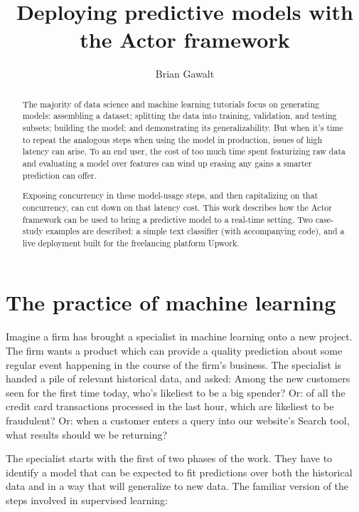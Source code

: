 \documentclass{article}
\begin{document}
\title{Deploying predictive models with the Actor framework}
\author{Brian Gawalt}

\maketitle


\begin{abstract}
The majority of data science and machine learning tutorials focus on generating models: assembling a dataset; splitting the data into training, validation, and testing subsets; building the model; and demonstrating its generalizability. But when it's time to repeat the analogous steps when using the model in production, issues of high latency can arise. To an end user, the cost of too much time spent featurizing raw data and evaluating a model over features can wind up erasing any gains a smarter prediction can offer. 

Exposing concurrency in these model-usage steps, and then capitalizing on that concurrency, can cut down on that latency cost. This work describes how the Actor framework can be used to bring a predictive model to a real-time setting. Two case-study examples are described: a simple text classifier (with accompanying code), and a live deployment built for the freelancing platform Upwork.
\end{abstract}

\section{The practice of machine learning}

Imagine a firm has brought a specialist in machine learning onto a new project. The firm wants a product which can provide a quality prediction about some regular event happening in the course of the firm's business. The specialist is handed a pile of relevant historical data, and asked: Among the new customers seen for the first time today, who's likeliest to be a big spender? Or: of all the credit card transactions processed in the last hour, which are likeliest to be fraudulent? Or: when a customer enters a query into our website's Search tool, what results should we be returning?

The specialist starts with the first of two phases of the work. They have to identify a model that can be expected to fit predictions over both the historical data and in a way that will generalize to new data. The familiar version of the steps involved in supervised learning: 
\end{document}
